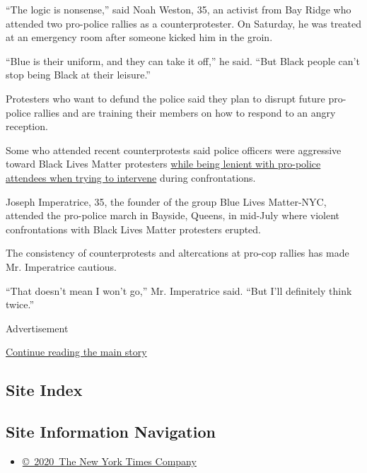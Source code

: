 ``The logic is nonsense,'' said Noah Weston, 35, an activist from Bay
Ridge who attended two pro-police rallies as a counterprotester. On
Saturday, he was treated at an emergency room after someone kicked him
in the groin.

``Blue is their uniform, and they can take it off,'' he said. ``But
Black people can't stop being Black at their leisure.''

Protesters who want to defund the police said they plan to disrupt
future pro-police rallies and are training their members on how to
respond to an angry reception.

Some who attended recent counterprotests said police officers were
aggressive toward Black Lives Matter protesters
\href{https://gothamist.com/news/nypd-accused-protecting-violent-blue-lives-matter-marchers-bay-ridge}{while
being lenient with pro-police attendees when trying to intervene} during
confrontations.

Joseph Imperatrice, 35, the founder of the group Blue Lives Matter-NYC,
attended the pro-police march in Bayside, Queens, in mid-July where
violent confrontations with Black Lives Matter protesters erupted.

The consistency of counterprotests and altercations at pro-cop rallies
has made Mr. Imperatrice cautious.

``That doesn't mean I won't go,'' Mr. Imperatrice said. ``But I'll
definitely think twice.''

Advertisement

\protect\hyperlink{after-bottom}{Continue reading the main story}

\hypertarget{site-index}{%
\subsection{Site Index}\label{site-index}}

\hypertarget{site-information-navigation}{%
\subsection{Site Information
Navigation}\label{site-information-navigation}}

\begin{itemize}
\tightlist
\item
  \href{https://help.nytimes3xbfgragh.onion/hc/en-us/articles/115014792127-Copyright-notice}{©~2020~The
  New York Times Company}
\end{itemize}

